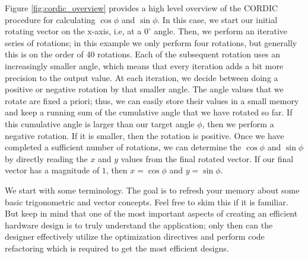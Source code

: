 Figure \ref{fig:cordic_overview} provides a high level overview of the CORDIC procedure for calculating $\cos \phi$ and $\sin \phi$. In this case, we start our initial rotating vector on the x-axis, i.e, at a $0^\circ$ angle. Then, we perform an iterative series of rotations; in this example we only perform four rotations, but generally this is on the order of 40 rotations. Each of the subsequent rotation uses an increasingly smaller angle, which means that every iteration adds a bit more precision to the output value. At each iteration, we decide between doing a positive or negative rotation by that smaller angle. The angle values that we rotate are fixed a priori; thus, we can easily store their values in a small memory and keep a running sum of the cumulative angle that we have rotated so far. If this cumulative angle is larger than our target angle $\phi$, then we perform a negative rotation. If it is smaller, then the rotation is positive. Once we have completed a sufficient number of rotations, we can determine the $\cos \phi$ and $\sin \phi$ by directly reading the $x$ and $y$ values from the final rotated vector. If our final vector has a magnitude of $1$, then $x = \cos \phi$ and $y = \sin \phi$.


We start with some terminology. The goal is to refresh your memory about some basic trigonometric and vector concepts. Feel free to skim this if it is familiar. But keep in mind that one of the most important aspects of creating an efficient hardware design is to truly understand the application; only then can the designer effectively utilize the optimization directives and perform code refactoring which is required to get the most efficient designs. 

